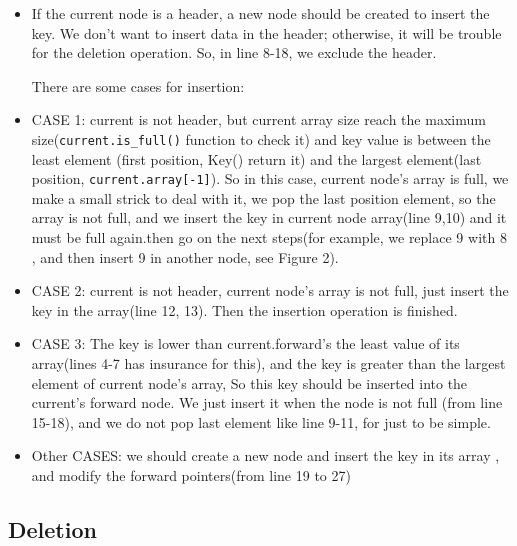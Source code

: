 \documentclass[sigconf, nonacm, letterpaper,top=2cm,bottom=2cm,left=3cm,right=3cm,marginparwidth=1.75cm]{acmart}
\begin{document}
\begin{itemize}


\item  If the current node is a header, a new node should be created to insert the key. We don’t want to insert data in the header; otherwise, it will be trouble for the deletion operation. So, in line 8-18, we exclude the header.
  
There are some cases for insertion:

\item CASE 1: current is not header, but current array size reach the maximum size(\texttt{current.is\_full()} function to check it) and key value is between the least element (first position, Key() return it) and the largest element(last position, \texttt{current.array[-1]}). So in this case, current node’s array is full, we make a small strick to deal with it, we pop the last position element, so the array is not full, and we insert the key in current node array(line 9,10) and it must be full again.then go on the next steps(for example, we replace 9 with 8 , and then insert 9 in another node, see Figure 2).

\item CASE 2: current is not header, current node’s array is not full, just insert the key in the array(line 12, 13). Then the insertion operation is finished.

\item CASE 3: The key is lower than current.forward’s the least value of its array(lines 4-7 has insurance for this), and the key is greater than the largest element of current node’s array, So this key should be inserted into the current’s forward node. We just insert it when the node is not full (from line 15-18), and we do not pop last element like line 9-11, for just to be simple.
\item Other CASES:  we should create a new node and insert the key in its array , and modify the forward pointers(from line 19 to 27)
\end{itemize}

\subsection{Deletion}
\end{document}
